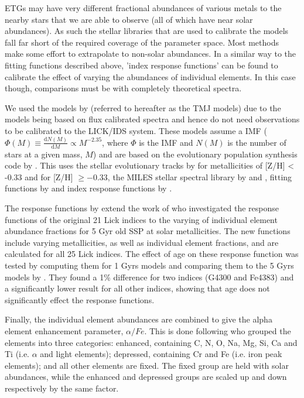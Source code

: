 		ETGs may have very different fractional abundances of various metals to the nearby stars that we are able to observe (all of which have near solar abundances). As such the stellar libraries that are used to calibrate the models fall far short of the required coverage of the parameter space. Most methods make some effort to extrapolate to non-solar abundances. In a similar way to the fitting functions described above, 'index response functions' can be found to calibrate the effect of varying the abundances of individual elements. In this case though, comparisons must be with completely theoretical spectra.

		We used the models by \citet{Thomas2010} (referred to hereafter as the TMJ models) due to the models being based on flux calibrated spectra and hence do not need observations to be calibrated to the LICK/IDS system. These models assume a \citet{Salpeter1955} IMF ($\Phi(M) \equiv \frac{\mathrm{d}N(M)}{\mathrm{d}M} \propto M^{-2.35}$, where $\Phi$ is the IMF and $N(M)$ is the number of stars at a given mass, $M$) and are based on the evolutionary population synthesis code by \citet{Maraston1998}. This uses the stellar evolutionary tracks by \citet{Cassisi1997} for metallicities of [Z/H] < -0.33 and \citet{Girardi2000} for [Z/H] $\ge -0.33$, the MILES stellar spectral library by \citet{Sanchez-Blazquez2006a} and \citet{Falcon-Barroso2011a}, fitting functions by \citet{Johansson2010} and index response functions by \citet{Korn2005}.

		The response functions by \citet{Korn2005} extend the work of \citet{Tripicco1995} who investigated the response functions of the original 21 Lick indices to the varying of individual element abundance fractions for 5 Gyr old SSP at solar metallicities. The new functions include varying metallicities, as well as individual element fractions, and are calculated for all 25 Lick indices. The effect of age on these response function was tested by computing them for 1 Gyrs models and comparing them to the 5 Gyrs models by \citet{Tripicco1995}. They found a 1\% difference for two indices (G4300 and Fe4383) and a significantly lower result for all other indices, showing that age does not significantly effect the response functions.

		Finally, the individual element abundances are combined to give the alpha element enhancement parameter, $\alpha/Fe$. This is done following \citet{Trager2000} who grouped the elements into three categories: enhanced, containing C, N, O, Na, Mg, Si, Ca and Ti (i.e. $\alpha$ and light elements); depressed, containing Cr and Fe (i.e. iron peak elements); and all other elements are fixed. The fixed group are held with solar abundances, while the enhanced and depressed groups are scaled up and down respectively by the same factor. 

